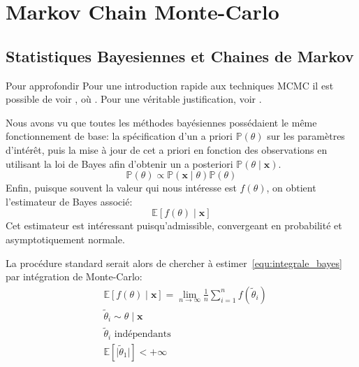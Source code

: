 
\cleardoublepage
{}
\chapter{Markov Chain Monte-Carlo}\label{annexe:mcmc}

\section{Statistiques Bayesiennes et Chaines de Markov}

\begin{remark}{Pour approfondir}
    Pour une introduction rapide aux techniques MCMC il est possible de voir \citet{Goncalves2015}, \citet{Lam2008} où \citet{Andrieu2003}. Pour une véritable justification, voir \citet{Robert2004b}.
\end{remark}

Nous avons vu que toutes les méthodes bayésiennes possédaient le même fonctionnement de base: la spécification d'un a priori $\mathbb{P} ( \theta )$ sur les paramètres d'intérêt, puis la mise à jour de cet a priori en fonction des observations en utilisant la loi de Bayes afin d'obtenir un a posteriori $\mathbb{P} ( \theta \mid \mathbf{x} )$.
\begin{equation*}
    \mathbb{P} ( \theta ) \varpropto \mathbb{P} ( \mathbf{x} \mid \theta ) \mathbb{P} ( \theta )
\end{equation*}
Enfin, puisque souvent la valeur qui nous intéresse est $f(\theta)$, on obtient l'estimateur de Bayes associé:
\begin{equation}
    \mathbb{E} \left[ f(\theta) \mid \mathbf{x} \right]\label{equ:integrale_bayes}
\end{equation}
Cet estimateur est intéressant puisqu’admissible, convergeant en probabilité et asymptotiquement normale.

La procédure standard serait alors de chercher à estimer~\ref{equ:integrale_bayes} par intégration de Monte-Carlo:
\begin{align*}
    &\mathbb{E} \left[ f(\theta) \mid \mathbf{x} \right] = \lim_{n \to \infty} \frac{1}{n} \sum_{i = 1}^n f(\tilde{\theta}_i) \\
    &\tilde{\theta}_i \sim \theta \mid \mathbf{x} \\
    &\tilde{\theta}_i \text{ indépendants} \\
    &\mathbb{E} \left[ \vert \tilde{\theta}_1 \vert \right] < +\infty
\end{align*}

